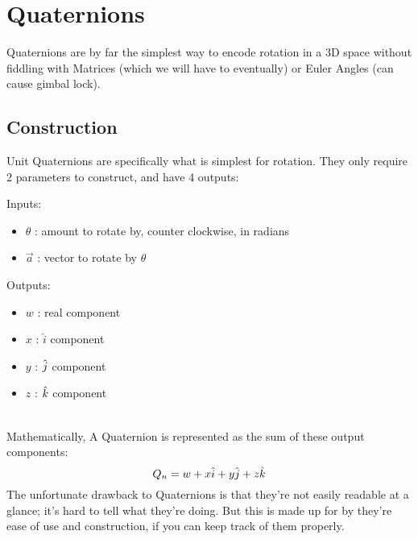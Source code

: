 
\section{Quaternions}
Quaternions are by far the simplest way to encode rotation in a 3D space without fiddling with Matrices (which we will have to eventually) or Euler Angles (can cause gimbal lock).

\subsection{Construction}
Unit Quaternions are specifically what is simplest for rotation. They only require 2 parameters to construct, and have 4 outputs:
\\
\begin{minipage}{\textwidth}
\begin{multicols}{2}
\noindent
\raggedcolumns
Inputs:
\begin{itemize}
\item $\theta$ : amount to rotate by, counter clockwise, in radians
\item $\vec{a}$ : vector to rotate by $\theta$ 
\end{itemize}
\columnbreak
Outputs:
\begin{itemize}
\item $w$ : real component
\item $x$ : $\hat{i}$ component
\item $y$ : $\hat{\textcolor{black}{j}}$ component
\item $z$ : $\hat{\textcolor{black}{k}}$ component
\end{itemize}
\end{multicols}
\end{minipage}
\bigskip
\\
Mathematically, A Quaternion is represented as the sum of these output components:
$$Q_n = w + x\hat{i} + y\hat{\textcolor{black}{j}} + z\hat{\textcolor{black}{k}}$$
The unfortunate drawback to Quaternions is that they're not easily readable at a glance; it's hard to tell what they're doing. But this is made up for by they're ease of use and construction, if you can keep track of them properly.

